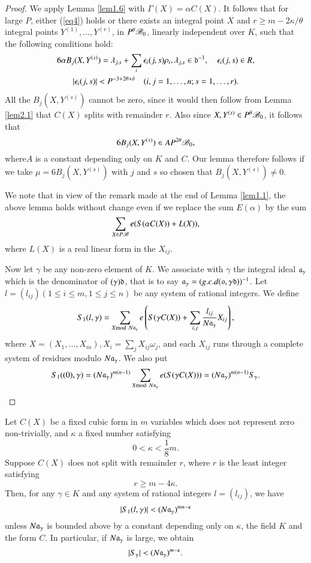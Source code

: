 \begin{proof}
We apply Lemma \ref{lem1.6} with $\Gamma(X)=\alpha C(X)$. It follows 
that for large $P$, either (\ref{eq4}) holds or there exists an 
integral point $X$ and $r\geq m-2\kappa/\theta$ integral points 
$Y^{(1)},\ldots,Y^{(r)}$, in $P^\theta\mathscr{B}_0$, linearly independent over 
$K$, such that the following conditions hold:
\begin{gather*}
6\alpha B_j(X,Y^{(s)})=\lambda_{j,s}+\sum\limits_i\epsilon_i(j,s) 
\rho_i, 
\lambda_{j,s}\in\mathfrak{d}^{-1},\quad \epsilon_i(j,s)\in R,\\ 
\left|{\epsilon_i(j,s)}\right|<P^{-3+2\theta+\delta}\quad (i,j=1,\ldots, 
n;s=1,\ldots,r).
\end{gather*}
All the $B_j(X,Y^{(s)})$ cannot be zero, since it would then follow 
from Lemma \ref{lem2.1} that $C(X)$ splits with remainder $r$. Also since 
$X,Y^{(s)}\in P^\theta\mathscr{B}_0$, it follows that
$$
6B_j(X,Y^{(s)})\in AP^{2\theta}\mathscr{B}_0,
$$
where\pageoriginale $A$ is a constant depending only on $K$ and $C$. 
Our lemma therefore follows if we take $\mu=6B_j(X,Y^{(s)})$ with $j$ 
and $s$ so chosen that $B_j(X,Y^{(s)})\neq 0$.

We note that in view of the remark made at the end of Lemma 
\ref{lem1.1}, the above lemma holds without change even if we replace 
the sum $E(\alpha)$ by the sum
$$
\sum\limits_{X\in P\mathscr{B}}e(S(\alpha C(X))+L(X)),
$$
where $L(X)$ is a real linear form in the $X_{ij}$.

Now let $\gamma$ be any non-zero element of $K$. We associate with 
$\gamma$ the integral ideal $\mathfrak{a}_\gamma$ which is the denominator 
of $(\gamma)\mathfrak{d}$, that is to say $\mathfrak{a}_\gamma=(g.c.d(\mathfrak{o},\gamma 
\mathfrak{d}))^{-1}$. Let $l=(l_{ij}) (1\leq i\leq m,1\leq j\leq n)$ be any 
system of rational integers. We define 
$$
S_1(l,\gamma)=\sum\limits_{X{\rm{mod}}\kern.3em N \mathfrak{a}_\gamma}e\left({S(\gamma 
C(X))+\sum\limits_{i,j}\frac{l_{ij}}{N\mathfrak{a}_\gamma}X_{ij}}\right),
$$
where $X=(X_1,\ldots,X_m),X_i=\sum\limits_j X_{ij}\omega_j$, and each $X_{ij}$ 
runs through a complete system of residues modulo $N\mathfrak{a}_\gamma$. We 
also put
$$
S_1((0),\gamma)=(N\mathfrak{a}_\gamma)^{m(n-1)}\sum\limits_{X{\rm{mod}}\kern.3em N\mathfrak{a}_\gamma} 
e(S(\gamma C(X)))=(N\mathfrak{a}_\gamma)^{m(n-1)}S_\gamma.
$$
\end{proof}

\begin{lemma}\label{lem2.3}
Let $C(X)$ be a fixed cubic form in $m$ variables which does not 
represent zero non-trivially, and $\kappa$ a fixed number satisfying
$$
0<\kappa <\frac{1}{8}m.
$$
Suppose $C(X)$ does not split with remainder $r$, where $r$ is the 
least integer satisfying
$$
r\geq m-4\kappa.
$$
Then, for any $\gamma\in K$ and any system of rational integers 
$l=(l_{ij})$, we have 
\begin{equation}\label{eq6}
\left|{S_1(l,\gamma)}\right|<(N\mathfrak{a}_\gamma)^{mn-\kappa}
\end{equation}
unless $N\mathfrak{a}_\gamma$ is bounded above by a constant depending only on 
$\kappa$, the field $K$ and the form $C$. In particular, if 
$N\mathfrak{a}_\gamma$ is large, we obtain
\begin{equation}\label{eq7}
|S_\gamma|<(N\mathfrak{a}_\gamma)^{m-\kappa}.
\end{equation}
\end{lemma}

